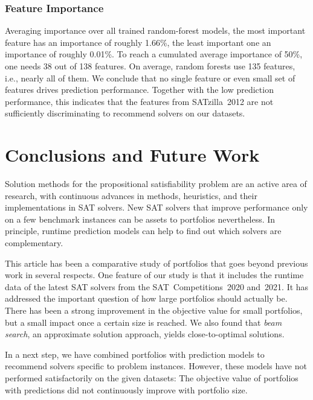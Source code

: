 \documentclass[a4paper,USenglish,pdfa]{lipics-v2021} %
\begin{document}
\subsubsection{Feature Importance}

Averaging importance over all trained random-forest models, the most important feature has an importance of roughly 1.66\%, the least important one an importance of roughly 0.01\%.
To reach a cumulated average importance of 50\%, one needs 38 out of 138 features.
On average, random forests use 135 features, i.e., nearly all of them.
We conclude that no single feature or even small set of features drives prediction performance.
Together with the low prediction performance, this indicates that the features from SATzilla~2012 are not sufficiently discriminating to recommend solvers on our datasets.

\section{Conclusions and Future Work}
\label{sec:conclusion}

Solution methods for the propositional satisfiability problem are an active area of research, with continuous advances in methods, heuristics, and their implementations in SAT solvers. 
New SAT solvers that improve performance only on a few benchmark instances can be assets to portfolios nevertheless. 
In principle, runtime prediction models can help to find out which solvers are complementary. 

This article has been a comparative study of portfolios that goes beyond previous work in several respects.
One feature of our study is that it includes the runtime data of the latest SAT solvers from the SAT~Competitions~2020 and~2021. 
It has addressed the important question of how large portfolios should actually be.
There has been a strong improvement in the objective value for small portfolios, but a small impact once a certain size is reached. 
We also found that \emph{beam search}, an approximate solution approach, yields close-to-optimal solutions.

In a next step, we have combined portfolios with prediction models to recommend solvers specific to problem instances.
However, these models have not performed satisfactorily on the given datasets:
The objective value of portfolios with predictions did not continuously improve with portfolio size.
\end{document}
